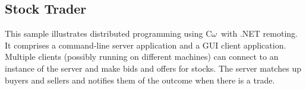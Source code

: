 \documentclass{article}
\newcommand{\comega}{\mbox{C$\omega$}}
\begin{document}
\subsection{Stock Trader}
This sample illustrates distributed programming using \comega\ with
.NET remoting. It comprises a command-line server application and a
GUI client application. Multiple clients (possibly running on
different machines) can connect to an instance of the server and make
bids and offers for stocks. The server matches up buyers and sellers
and notifies them of the outcome when there is a trade.


\end{document}
